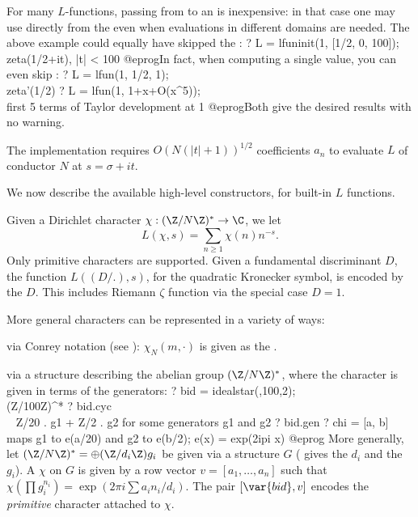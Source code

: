 For many $L$-functions, passing from  to an  is
inexpensive: in that case one may use  directly from the
 even when evaluations in different domains are needed. The
above example could equally have skipped the :
\bprog
? L = lfuninit(1, [1/2, 0, 100]); \\ zeta(1/2+it), |t| < 100
@eprog\noindent In fact, when computing a single value, you can even skip
:
\bprog
? L = lfun(1, 1/2, 1); \\ zeta'(1/2)
? L = lfun(1, 1+x+O(x^5)); \\ first 5 terms of Taylor development at 1
@eprog\noindent Both give the desired results with no warning.

The implementation requires $O(N(|t|+1))^{1/2}$ coefficients $a_n$
to evaluate $L$ of conductor $N$ at $s = \sigma + i t$.

We now describe the available high-level constructors, for built-in $L$
functions.


Given a Dirichlet character $\chi:(\Z/N\Z)^*\to \C$, we let
$$L(\chi, s) = \sum_{n\geq 1} \chi(n) n^{-s}.$$
Only primitive characters are supported. Given a fundamental discriminant
$D$, the function $L((D/.), s)$, for the quadratic Kronecker symbol, is encoded
by the  $D$. This includes Riemann $\zeta$ function via the special
case $D = 1$.

More general characters can be represented in a variety of ways:

\item via Conrey notation (see ): $\chi_N(m,\cdot)$
is given as the  .

\item via a  structure describing the abelian  group $(\Z/N\Z)^*$,
where the character is given in terms of the  generators:
\bprog
  ? bid = idealstar(,100,2); \\ (Z/100Z)^*
  ? bid.cyc \\ ~ Z/20 . g1  + Z/2 . g2 for some generators g1 and g2
  ? bid.gen
  ? chi = [a, b]  \\ maps g1 to e(a/20) and g2 to e(b/2);  e(x) = exp(2ipi x)
@eprog\noindent
More generally, let $(\Z/N\Z)^* = \oplus (\Z/d_i\Z) g_i$ be given via a
 structure $G$ ( gives the $d_i$ and  the
$g_i$). A  $\chi$ on $G$ is given by a row vector
$v = [a_1,\ldots,a_n]$ such that $\chi(\prod g_i^{n_i}) = \exp(2\pi i\sum a_i
n_i / d_i)$. The pair $[\var{bid}, v]$ encodes the \emph{primitive} character
attached to $\chi$.

